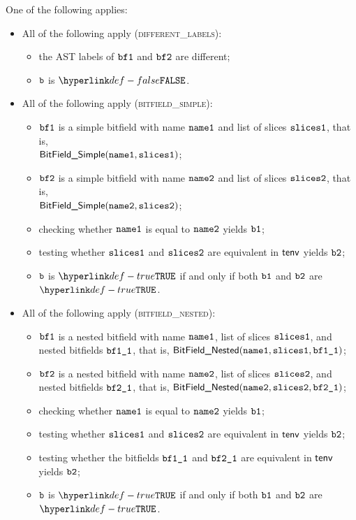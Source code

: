 \documentclass{book}
\newcommand\ProseOrTypeError[0]{\ProseTerminateAs{\TypeErrorConfig}}
\begin{document}
One of the following applies:
\begin{itemize}
  \item All of the following apply (\textsc{different\_labels}):
  \begin{itemize}
    \item the AST labels of $\texttt{bf1}$ and $\texttt{bf2}$ are different;
    \item $\texttt{b}$ is $\False$.
  \end{itemize}

  \item All of the following apply (\textsc{bitfield\_simple}):
  \begin{itemize}
    \item $\texttt{bf1}$ is a simple bitfield with name $\texttt{name1}$ and list of slices $\texttt{slices1}$, that is, \\ $\textsf{BitField\_Simple}(\texttt{name1}, \texttt{slices1})$;
    \item $\texttt{bf2}$ is a simple bitfield with name $\texttt{name2}$ and list of slices $\texttt{slices2}$, that is, \\ $\textsf{BitField\_Simple}(\texttt{name2}, \texttt{slices2})$;
    \item checking whether $\texttt{name1}$ is equal to $\texttt{name2}$ yields $\texttt{b1}$;
    \item testing whether $\texttt{slices1}$ and $\texttt{slices2}$ are equivalent in $\textsf{tenv}$ yields $\texttt{b2}$\ProseOrTypeError;
    \item $\texttt{b}$ is $\True$ if and only if both $\texttt{b1}$ and $\texttt{b2}$ are $\True$.
  \end{itemize}

  \item All of the following apply (\textsc{bitfield\_nested}):
  \begin{itemize}
    \item $\texttt{bf1}$ is a nested bitfield with name $\texttt{name1}$, list of slices $\texttt{slices1}$, and nested bitfields $\texttt{bf1\_1}$, that is,
          $\textsf{BitField\_Nested}(\texttt{name1}, \texttt{slices1}, \texttt{bf1\_1})$;
    \item $\texttt{bf2}$ is a nested bitfield with name $\texttt{name2}$, list of slices $\texttt{slices2}$, and nested bitfields $\texttt{bf2\_1}$, that is,
          $\textsf{BitField\_Nested}(\texttt{name2}, \texttt{slices2}, \texttt{bf2\_1})$;
    \item checking whether $\texttt{name1}$ is equal to $\texttt{name2}$ yields $\texttt{b1}$;
    \item testing whether $\texttt{slices1}$ and $\texttt{slices2}$ are equivalent in $\textsf{tenv}$ yields $\texttt{b2}$\ProseOrTypeError;
    \item testing whether the bitfields $\texttt{bf1\_1}$ and $\texttt{bf2\_1}$ are equivalent in $\textsf{tenv}$ yields $\texttt{b2}$\ProseOrTypeError;
    \item $\texttt{b}$ is $\True$ if and only if both $\texttt{b1}$ and $\texttt{b2}$ are $\True$.
  \end{itemize}


\end{itemize}
\end{document}
